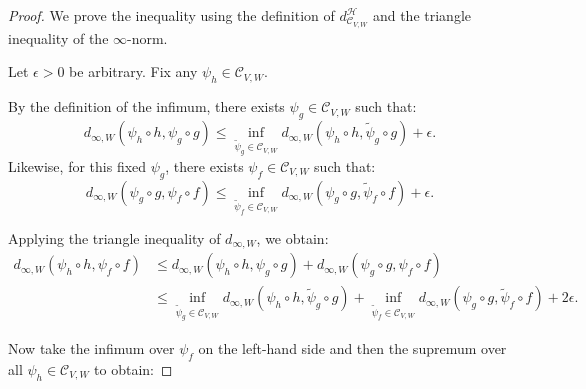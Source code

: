 \begin{proof}
We prove the inequality using the definition of \( d^\mathcal{H}_{\mathcal{C}_{V,W}} \) and the triangle inequality of the \( \infty \)-norm.

Let \( \epsilon > 0 \) be arbitrary.
Fix any \( \psi_h \in \mathcal{C}_{V,W} \). 

By the definition of the infimum, there exists \( \psi_g \in \mathcal{C}_{V,W} \) such that:
\[
d_{\infty,W}(\psi_h \circ h, \psi_g \circ g) \leq \inf_{\tilde{\psi}_g \in \mathcal{C}_{V,W}} d_{\infty,W}(\psi_h \circ h, \tilde{\psi}_g \circ g) + \epsilon.
\]
Likewise, for this fixed \( \psi_g \), there exists \( \psi_f \in \mathcal{C}_{V,W} \) such that:
\[
d_{\infty,W}(\psi_g \circ g, \psi_f \circ f) \leq \inf_{\tilde{\psi}_f \in \mathcal{C}_{V,W}} d_{\infty,W}(\psi_g \circ g, \tilde{\psi}_f \circ f) + \epsilon.
\]

Applying the triangle inequality of \( d_{\infty,W} \), we obtain:
\begin{align*}
d_{\infty,W}(\psi_h \circ h, \psi_f \circ f) 
&\leq d_{\infty,W}(\psi_h \circ h, \psi_g \circ g) + d_{\infty,W}(\psi_g \circ g, \psi_f \circ f) \\
&\leq \inf_{\tilde{\psi}_g \in \mathcal{C}_{V,W}} d_{\infty,W}(\psi_h \circ h, \tilde{\psi}_g \circ g) + \inf_{\tilde{\psi}_f \in \mathcal{C}_{V,W}} d_{\infty,W}(\psi_g \circ g, \tilde{\psi}_f \circ f) + 2\epsilon.
\end{align*}

Now take the infimum over \( \psi_f \) on the left-hand side and then the supremum over all \( \psi_h \in \mathcal{C}_{V,W} \) to obtain:


\end{proof}
